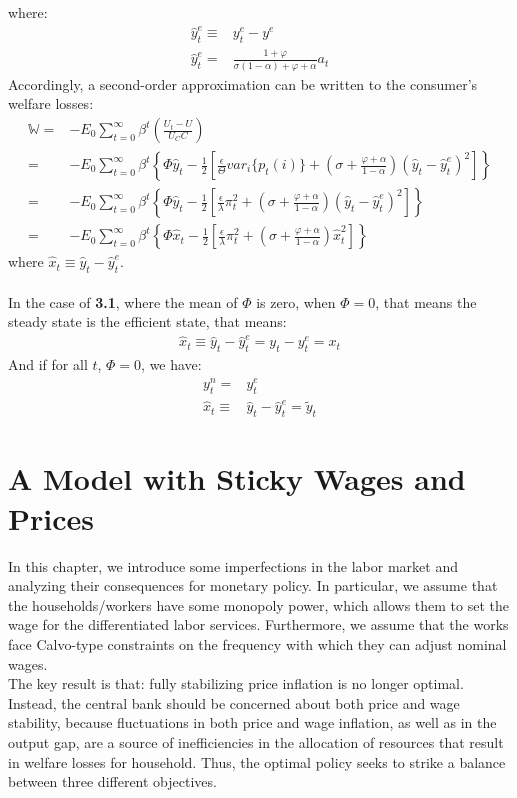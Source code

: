 \documentclass{article}
\numberwithin{equation}{section}
\begin{document}
where:
	\begin{align*}
		\hat{y}^e_t \equiv &y^e_t - y^e\\
		\hat{y}^e_t = &\frac{1 + \varphi}{\sigma(1 - \alpha) + \varphi + \alpha}a_t
	\end{align*}
Accordingly, a second-order approximation can be written to the consumer's welfare losses:
	\begin{align*}
		\mathbb{W} = &-E_0 \sum\limits^\infty_{t=0} \beta^t \left( \frac{U_t - U}{U_C C} \right)\\
		= &-E_0 \sum\limits^\infty_{t=0} \beta^t \left\{ \Phi\hat{y}_t - \frac{1}{2} \left[ \frac{\epsilon}{\Theta}var_i\{ p_t(i) \} + (\sigma + \frac{\varphi + \alpha}{1 - \alpha}) (\hat{y}_t- \hat{y}^e_t)^2 \right] \right\}\\
		= &-E_0 \sum\limits^\infty_{t=0} \beta^t \left\{ \Phi\hat{y}_t - \frac{1}{2} \left[ \frac{\epsilon}{\lambda}\pi^2_t + (\sigma + \frac{\varphi + \alpha}{1 - \alpha}) (\hat{y}_t- \hat{y}^e_t)^2 \right] \right\}\\
		= &-E_0 \sum\limits^\infty_{t=0} \beta^t \left\{ \Phi\hat{x}_t - \frac{1}{2} \left[ \frac{\epsilon}{\lambda}\pi^2_t + (\sigma + \frac{\varphi + \alpha}{1 - \alpha}) \hat{x}^2_t \right] \right\}
	\end{align*}
where $\hat{x}_t \equiv \hat{y}_t - \hat{y}^e_t$.\\\\
In the case of \textbf{3.1}, where the mean of $\Phi$ is zero, when $\Phi = 0$, that means the steady state is the efficient state, that means:
	\begin{align*}
		\hat{x}_t \equiv \hat{y}_t - \hat{y}^e_t = y_t - y^e_t = x_t 
	\end{align*} 
And if for all $t$, $\Phi = 0$, we have:
	\begin{align*}
		y^n_t = &y^e_t\\
		\hat{x}_t \equiv &\hat{y}_t - \hat{y}^e_t = \tilde{y}_t
	\end{align*}



\newpage
\section{A Model with Sticky Wages and Prices}
In this chapter, we introduce some imperfections in the labor market and analyzing their consequences for monetary policy. In particular, we assume that the households/workers have some monopoly power, which allows them to set the wage for the differentiated labor services. Furthermore, we assume that the works face Calvo-type constraints on the frequency with which they can adjust nominal wages.\\
The key result is that: fully stabilizing price inflation is no longer optimal. Instead, the central bank should be concerned about both price and wage stability, because fluctuations in both price and wage inflation, as well as in the output gap, are a source of inefficiencies in the allocation of resources that result in welfare losses for household. Thus, the optimal policy seeks to strike a balance between three different objectives.
\end{document}
